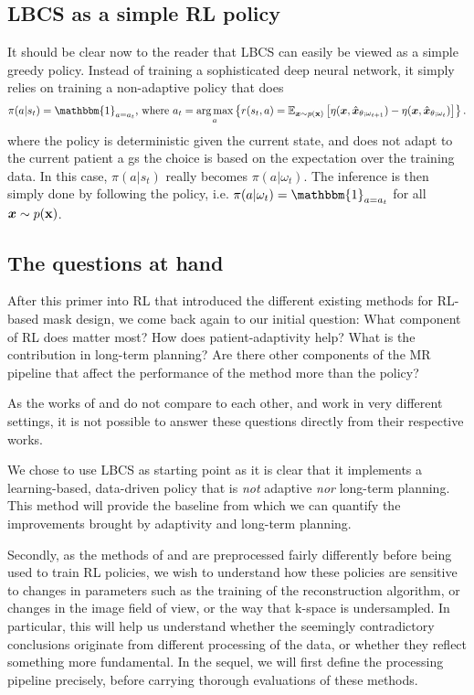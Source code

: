 \subsection{LBCS as a simple RL policy}
It should be clear now to the reader that LBCS can easily be viewed as a simple greedy policy. Instead of training a sophisticated deep neural network, it simply relies on training a non-adaptive policy that does
$$\pi(a|s_t) = \mathbbm{1}_{a=a_t} \text{, where~} a_t = \argmax_a \left\{r(s_t,a) = \mathbb{E}_{\vx \sim p(\rvx)}\left[\eta(\vx, \hat{\vx}_{\theta; \omega_{t+1}}) - \eta(\vx, \hat{\vx}_{\theta; \omega_{t}})\right]\right\}.$$
where the policy is deterministic given the current state, and does not adapt to the current patient a gs the choice is based on the expectation over the training data. In this case, $\pi(a|s_t)$ really becomes $\pi(a|\omega_t)$. The inference is then simply done by following the policy, i.e. $\pi(a|\omega_t) = \mathbbm{1}_{a=a_t}$ for all ${\bm{x}} \sim p({\mathbf{x}})$.


\subsection{The questions at hand}
After this primer into RL that introduced the different existing methods for RL-based mask design, we come back again to our initial question: What component of RL does matter most? How does patient-adaptivity help? What is the contribution in long-term planning? Are there other components of the MR pipeline that affect the performance of the method more than the policy?

As the works of \citet{pineda2020active} and \citet{bakker2020experimental} do not compare to each other, and work in very different settings, it is not possible to answer these questions directly from their respective works. 

We chose to use LBCS \citep{gozcu2018learning} as starting point as it is clear that it implements a learning-based, data-driven policy that is \textit{not} adaptive \textit{nor} long-term planning. This method will provide the baseline from which we can quantify the improvements brought by adaptivity and long-term planning. 

Secondly, as the methods of \citet{bakker2020experimental} and \citet{pineda2020active} are preprocessed fairly differently before being used to train RL policies, we wish to understand how these policies are sensitive to changes in parameters such as the training of the reconstruction algorithm, or changes in the image field of view, or the way that k-space is undersampled. In particular, this will help us understand whether the seemingly contradictory conclusions originate from different processing of the data, or whether they reflect something more fundamental. In the sequel, we will first define the processing pipeline precisely, before carrying thorough evaluations of these methods. 



